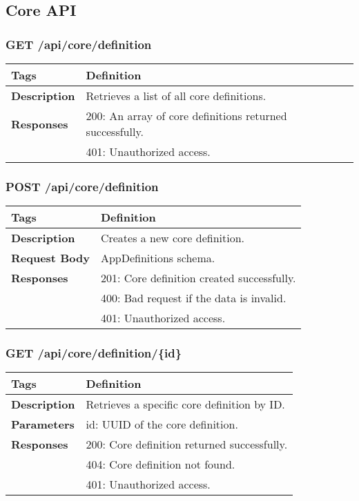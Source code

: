 \subsection{Core API}

\subsubsection*{GET /api/core/definition}
\begin{longtable}{|>{\raggedright\arraybackslash}p{3cm}|p{10cm}|}
\hline
\textbf{Tags} & Definition \\
\hline
\textbf{Description} & Retrieves a list of all core definitions. \\
\hline
\textbf{Responses} & 200: An array of core definitions returned successfully. \\
 & 401: Unauthorized access. \\
\hline
\end{longtable}

\subsubsection*{POST /api/core/definition}
\begin{longtable}{|>{\raggedright\arraybackslash}p{3cm}|p{10cm}|}
\hline
\textbf{Tags} & Definition \\
\hline
\textbf{Description} & Creates a new core definition. \\
\hline
\textbf{Request Body} & AppDefinitions schema. \\
\hline
\textbf{Responses} & 201: Core definition created successfully. \\
 & 400: Bad request if the data is invalid. \\
 & 401: Unauthorized access. \\
\hline
\end{longtable}

\subsubsection*{GET /api/core/definition/\{id\}}
\begin{longtable}{|>{\raggedright\arraybackslash}p{3cm}|p{10cm}|}
\hline
\textbf{Tags} & Definition \\
\hline
\textbf{Description} & Retrieves a specific core definition by ID. \\
\hline
\textbf{Parameters} & id: UUID of the core definition. \\
\hline
\textbf{Responses} & 200: Core definition returned successfully. \\
 & 404: Core definition not found. \\
 & 401: Unauthorized access. \\
\hline
\end{longtable}

